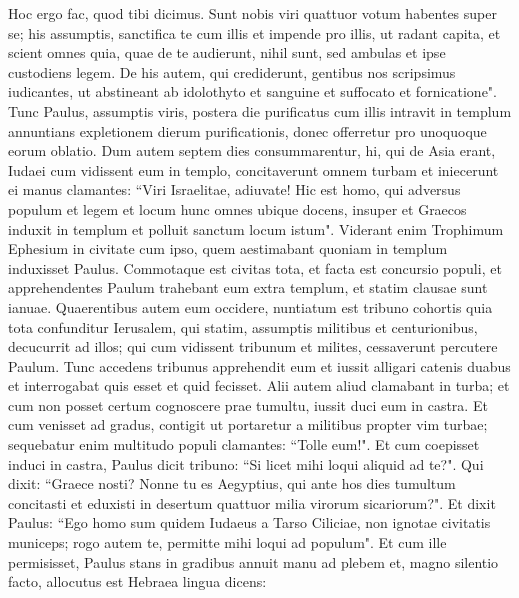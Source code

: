 \begin{biblechapter}
\verse Hoc ergo fac, quod tibi dicimus. Sunt nobis viri quattuor votum habentes super se; 
\verse his assumptis, sanctifica te cum illis et impende pro illis, ut radant capita, et scient omnes quia, quae de te audierunt, nihil sunt, sed ambulas et ipse custodiens legem.  
\verse De his autem, qui crediderunt, gentibus nos scripsimus iudicantes, ut abstineant ab idolothyto et sanguine et suffocato et fornicatione". 
\verse Tunc Paulus, assumptis viris, postera die purificatus cum illis intravit in templum annuntians expletionem dierum purificationis, donec offerretur pro unoquoque eorum oblatio. 
\verse Dum autem septem dies consummarentur, hi, qui de Asia erant, Iudaei cum vidissent eum in templo, concitaverunt omnem turbam et iniecerunt ei manus  
\verse clamantes: “Viri Israelitae, adiuvate! Hic est homo, qui adversus populum et legem et locum hunc omnes ubique docens, insuper et Graecos induxit in templum et polluit sanctum locum istum". 
\verse Viderant enim Trophimum Ephesium in civitate cum ipso, quem aestimabant quoniam in templum induxisset Paulus. 
\verse Commotaque est civitas tota, et facta est concursio populi, et apprehendentes Paulum trahebant eum extra templum, et statim clausae sunt ianuae. 
\verse Quaerentibus autem eum occidere, nuntiatum est tribuno cohortis quia tota confunditur Ierusalem, 
\verse qui statim, assumptis militibus et centurionibus, decucurrit ad illos; qui cum vidissent tribunum et milites, cessaverunt percutere Paulum. 
\verse Tunc accedens tribunus apprehendit eum et iussit alligari catenis duabus et interrogabat quis esset et quid fecisset. 
\verse Alii autem aliud clamabant in turba; et cum non posset certum cognoscere prae tumultu, iussit duci eum in castra. 
\verse Et cum venisset ad gradus, contigit ut portaretur a militibus propter vim turbae; 
\verse sequebatur enim multitudo populi clamantes: “Tolle eum!". 
\verse Et cum coepisset induci in castra, Paulus dicit tribuno: “Si licet mihi loqui aliquid ad te?". Qui dixit: “Graece nosti? 
\verse Nonne tu es Aegyptius, qui ante hos dies tumultum concitasti et eduxisti in desertum quattuor milia virorum sicariorum?". 
\verse Et dixit Paulus: “Ego homo sum quidem Iudaeus a Tarso Ciliciae, non ignotae civitatis municeps; rogo autem te, permitte mihi loqui ad populum". 
\verse Et cum ille permisisset, Paulus stans in gradibus annuit manu ad plebem et, magno silentio facto, allocutus est Hebraea lingua dicens: 
\end{biblechapter}

